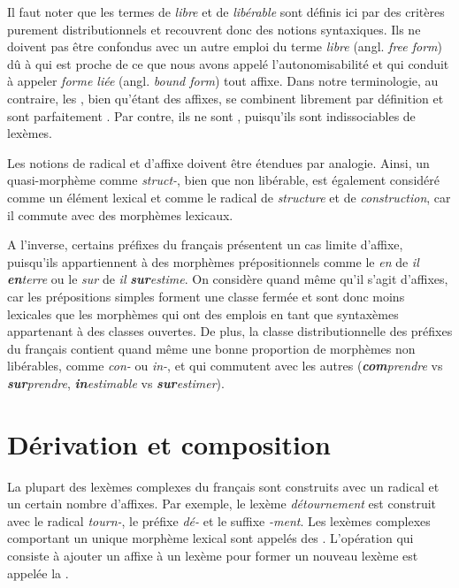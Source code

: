 Il faut noter que les termes de \textit{libre} et de \textit{libérable} sont définis ici par des critères purement distributionnels et recouvrent donc des notions syntaxiques. Ils ne doivent pas être confondus avec un autre emploi du terme \textit{libre} (angl. \textit{free form}) dû à \citet[§11.5]{bloomfield1933language} qui est proche de ce que nous avons appelé l’autonomisabilité et qui conduit à appeler \textit{forme liée} (angl. \textit{bound form}) tout affixe. Dans notre terminologie, au contraire, les , bien qu’étant des affixes, se combinent librement par définition et sont parfaitement . Par contre, ils ne sont , puisqu’ils sont indissociables de lexèmes.

Les notions de radical et d’affixe doivent être étendues par analogie. Ainsi, un quasi-morphème comme \textit{struct-}, bien que non libérable, est également considéré comme un élément lexical et comme le radical de \textit{structure} et de \textit{construction}, car il commute avec des morphèmes lexicaux.

A l’inverse, certains préfixes du français présentent un cas limite d’affixe, puisqu’ils appartiennent à des morphèmes prépositionnels comme le \textit{en} de \textit{il} \textbf{\textit{en}}\textit{terre} ou le \textit{sur} de \textit{il} \textbf{\textit{sur}}\textit{estime}. On considère quand même qu’il s’agit d’affixes, car les prépositions simples forment une classe fermée et sont donc moins lexicales que les morphèmes qui ont des emplois en tant que syntaxèmes appartenant à des classes ouvertes. De plus, la classe distributionnelle des préfixes du français contient quand même une bonne proportion de morphèmes non libérables, comme \textit{con-} ou \textit{in-}, et qui commutent avec les autres (\textbf{\textit{com}}\textit{prendre} vs \textbf{\textit{sur}}\textit{prendre}, \textbf{\textit{in}}\textit{estimable} vs \textbf{\textit{sur}}\textit{estimer}).

\section{Dérivation et composition}\label{sec:2.2.15}

La plupart des lexèmes complexes du français sont construits avec un radical et un certain nombre d’affixes. Par exemple, le lexème \textit{détournement} est construit avec le radical \textit{tourn-}, le préfixe \textit{dé-} et le suffixe \textit{{}-ment}. Les lexèmes complexes comportant un unique morphème lexical sont appelés des . L’opération qui consiste à ajouter un affixe à un lexème pour former un nouveau lexème est appelée la .

